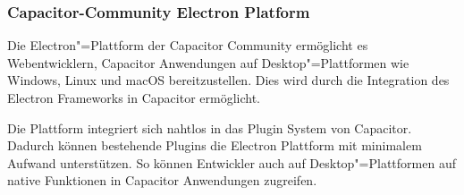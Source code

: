 \subsubsection{Capacitor-Community Electron Platform}

Die Electron"=Plattform der Capacitor Community ermöglicht es Webentwicklern, Capacitor Anwendungen auf Desktop"=Plattformen wie Windows, Linux und macOS bereitzustellen.
Dies wird durch die Integration des Electron Frameworks in Capacitor ermöglicht.
\cite{capacitor-electron}

Die Plattform integriert sich nahtlos in das Plugin System von Capacitor.~\cite{capacitor-electron}
Dadurch können bestehende Plugins die Electron Plattform mit minimalem Aufwand unterstützen.
So können Entwickler auch auf Desktop"=Plattformen auf native Funktionen in Capacitor Anwendungen zugreifen.
